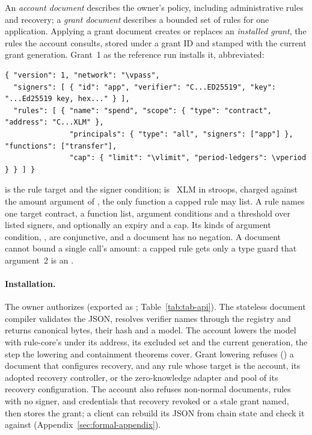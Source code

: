An \emph{account document} describes the owner's policy, including
administrative rules and recovery; a \emph{grant document} describes a bounded
set of rules for one application. Applying a grant document creates or replaces
an \emph{installed grant}, the rules the account consults, stored under a grant
ID and stamped with the current grant generation. Grant~1 as the reference run
installs it, abbreviated:
\def\vpass{\fact{standalone-passphrase}}\def\vlimit{\fact{grant1-cap-stroops}}%
\def\vperiod{\fact{grant1-period-ledgers}}%
\begin{Verbatim}[fontsize=\scriptsize,xleftmargin=1em,commandchars=\\\(\)]
{ "version": 1, "network": "\vpass",
  "signers": [ { "id": "app", "verifier": "C...ED25519", "key": "...Ed25519 key, hex..." } ],
  "rules": [ { "name": "spend", "scope": { "type": "contract", "address": "C...XLM" },
               "principals": { "type": "all", "signers": ["app"] }, "functions": ["transfer"],
               "cap": { "limit": "\vlimit", "period-ledgers": \vperiod } } ] }
\end{Verbatim}
 is the rule target and  the signer condition;
 is ~XLM in stroops, charged against the
amount argument of , the only function a capped
rule may list. A rule names one target contract, a function list, argument
conditions and a threshold over listed signers, and optionally an expiry and a
cap. Its  kinds of argument condition,
, are conjunctive, and a document has no negation. A
document cannot bound a single call's amount: a capped rule gets only a type
guard that argument~2 is an .

\paragraph{Installation.} The owner authorizes  (exported as
; Table~\ref{tab:tab-api}). The stateless document compiler
validates the JSON, resolves verifier names through the 
registry and returns canonical bytes, their hash  and a model.
The account lowers the model with rule-core's  under its
address, its excluded set and the current generation, the step the lowering and
containment theorems cover. Grant lowering refuses () a
document that configures recovery, and any rule whose target is the account, its
adopted recovery controller, or the zero-knowledge adapter and pool of its
recovery configuration. The account also refuses non-normal documents, rules with
no signer, and credentials that recovery revoked or a stale grant named, then
stores the grant; a client can rebuild its JSON from chain state and check it
against  (Appendix~\ref{sec:formal-appendix}).

